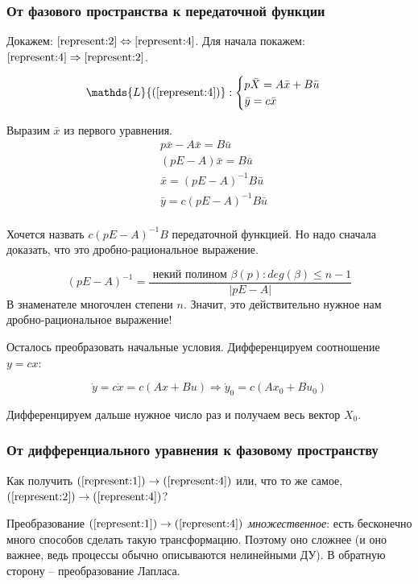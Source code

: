 \documentclass[main.tex]{subfiles}
\begin{document}
\subsubsection{ От фазового пространства к передаточной функции }

Докажем: $ \ref{represent:2} \Leftrightarrow \ref{represent:4} $.
Для начала покажем: $ \ref{represent:4} \Rightarrow \ref{represent:2} $.

\[ \mathds{L}\{ (\ref{represent:4}) \}: \begin{cases}
    p \bar X = A \bar x + B \bar u \\
    \bar y = c \bar x
\end{cases} \]

Выразим $ \bar x $ из первого уравнения.
\begin{align*}
    & p \bar x - A \bar x = B \bar u \\
    & (pE - A) \bar x = B \bar u \\
    & \bar x = (pE - A)^{-1} B \bar u \\
    & \bar y = c (pE-A)^{-1} B \bar u \\
\end{align*}

Хочется назвать $ c (pE-A)^{-1} B $ передаточной функцией.
Но надо сначала доказать, что это дробно-рациональное выражение.

\[ (pE - A)^{-1} = \frac{ \text{ некий полином } \beta(p) : deg(\beta) \le n-1 }{|pE-A|} \]
В знаменателе многочлен степени $ n $.
Значит, это действительно нужное нам дробно-рациональное выражение!

Осталось преобразовать начальные условия.
Дифференцируем соотношение $ y = c x $:

\[ \dot y = c \dot x = c(Ax + Bu) \Rightarrow \dot y_0  = c(Ax_0 + Bu_0) \]

Дифференцируем дальше нужное число раз и получаем весь вектор $ X_0 $.

\subsubsection{ От дифференциального уравнения к фазовому пространству }

Как получить $ (\ref{represent:1}) \to (\ref{represent:4})$ или, что то же самое, $ (\ref{represent:2}) \to (\ref{represent:4}) $?

Преобразование $ (\ref{represent:1}) \to (\ref{represent:4}) $ \emph{множественное}: есть бесконечно много способов сделать такую трансформацию.
Поэтому оно сложнее (и оно важнее, ведь процессы обычно описываются нелинейными ДУ).
В обратную сторону -- преобразование Лапласа.
\end{document}
